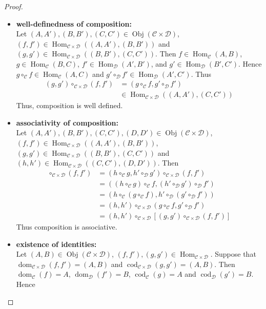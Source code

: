 \documentclass[12pt]{amsart}
\theoremstyle{definition}
\newcommand{\MC}{\mathcal{C}}
\newcommand{\MD}{\mathcal{D}}
\DeclareMathOperator{\dom}{dom}
\DeclareMathOperator{\cod}{cod}
\DeclareMathOperator{\Obj}{Obj}
\DeclareMathOperator{\Hom}{Hom}
\DeclareMathOperator*{\0}{\mbf{0}}
\DeclareMathOperator*{\1}{\mbf{1}}
\begin{document}
	\begin{proof}\
		\begin{itemize}
			\item \textbf{well-definedness of composition: } \\ 
			Let $(A, A'), (B, B'), (C, C') \in \Obj(\MC \times \MD)$, $(f, f') \in \Hom_{\MC \times \MD}((A, A'), (B, B'))$ and $(g, g') \in \Hom_{\MC \times \MD}((B, B'), (C, C'))$. Then $f \in \Hom_{\MC}(A, B)$, $g \in \Hom_{\MC}(B, C)$, $f'  \in \Hom_{\MD}(A', B')$, and  $g' \in \Hom_{\MD}(B', C')$. Hence $g \circ_{\MC} f \in \Hom_{\MC}(A, C)$ and $g' \circ_{\MD} f' \in \Hom_{\MD}(A', C')$. Thus 
			\begin{align*}
				(g,g') \circ_{\MC \times \MD} (f, f') 
				&= (g \circ_{\MC} f, g' \circ_{\MD} f') \\
				& \in \Hom_{\MC \times \MD}((A, A'), (C, C'))
			\end{align*}
			Thus, composition is well defined. \\
			\item \textbf{associativity of composition:} \\
			Let $(A, A'), (B, B'), (C, C'), (D, D') \in \Obj(\MC \times \MD)$, $(f, f') \in \Hom_{\MC \times \MD}((A, A'), (B, B'))$, $(g, g') \in \Hom_{\MC \times \MD}((B, B'), (C, C'))$ and $(h, h') \in \Hom_{\MC \times \MD}((C, C'), (D, D'))$. Then 
			\begin{align*}
				[(h, h') \circ_{\MC \times \MD} (g , g') ] \circ_{\MC \times \MD} (f, f')
				& = (h \circ_{\MC} g, h' \circ_{\MD} g') \circ_{\MC \times \MD} (f, f') \\
				& = ((h \circ_{\MC} g) \circ_{\MC} f, (h' \circ_{\MD} g') \circ_{\MD} f') \\
				& = (h \circ_{\MC} ( g \circ_{\MC} f), h' \circ_{\MD} (g' \circ_{\MD} f')) \\
				& = (h, h') \circ_{\MC \times \MD} (g \circ_{\MC} f, g' \circ_{\MD} f') \\
				& = (h, h') \circ_{\MC \times \MD} [(g, g') \circ_{\MC \times \MD} (f, f')]
			\end{align*} 
			Thus composition is associative. \\
			\item \textbf{existence of identities: } \\
			Let $(A, B) \in \Obj(\MC \times \MD)$, $(f, f'), (g,g') \in \Hom_{\MC \times \MD}$. Suppose that $\dom_{\MC \times \MD}(f, f') = (A, B)$ and $\cod_{\MC \times \MD}(g, g') = (A, B)$. Then $\dom_{\MC}(f) = A$, $\dom_{\MD}(f') = B$, $\cod_{\MC}(g) = A$ and  $\cod_{\MD}(g') = B$. Hence

\end{itemize}
\end{proof}
\end{document}
